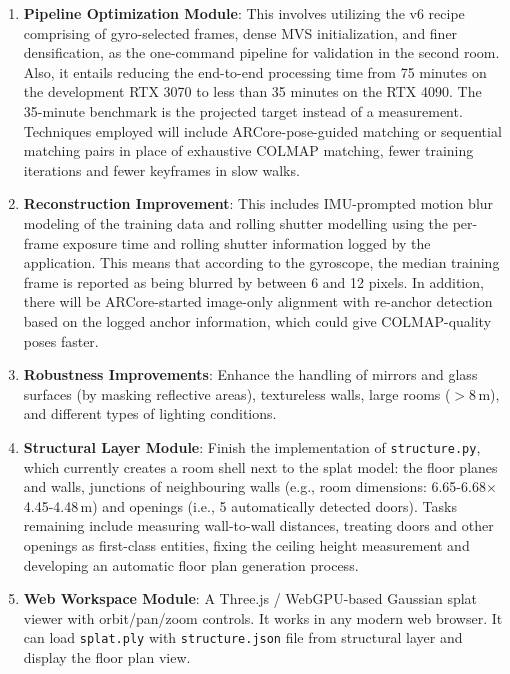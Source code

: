 \begin{enumerate}
    \item \textbf{Pipeline Optimization Module}: This involves utilizing the v6 recipe comprising of gyro-selected frames, dense MVS initialization, and finer densification, as the one-command pipeline for validation in the second room. Also, it entails reducing the end-to-end processing time from 75 minutes on the development RTX 3070 to less than 35 minutes on the RTX 4090. The 35-minute benchmark is the projected target instead of a measurement. Techniques employed will include ARCore-pose-guided matching or sequential matching pairs in place of exhaustive COLMAP matching, fewer training iterations and fewer keyframes in slow walks.

    \item \textbf{Reconstruction Improvement}: This includes IMU-prompted motion blur modeling of the training data and rolling shutter modelling using the per-frame exposure time and rolling shutter information logged by the application. This means that according to the gyroscope, the median training frame is reported as being blurred by between 6 and 12 pixels. In addition, there will be ARCore-started image-only alignment with re-anchor detection based on the logged anchor information, which could give COLMAP-quality poses faster.

    \item \textbf{Robustness Improvements}: Enhance the handling of mirrors and glass surfaces (by masking reflective areas), textureless walls, large rooms ($>$8\,m), and different types of lighting conditions.

    \item \textbf{Structural Layer Module}: Finish the implementation of \texttt{structure.py}, which currently creates a room shell next to the splat model: the floor planes and walls, junctions of neighbouring walls (e.g., room dimensions: 6.65-6.68$\times$4.45-4.48\,m) and openings (i.e., 5 automatically detected doors). Tasks remaining include measuring wall-to-wall distances, treating doors and other openings as first-class entities, fixing the ceiling height measurement and developing an automatic floor plan generation process.

    \item \textbf{Web Workspace Module}: A Three.js / WebGPU-based Gaussian splat viewer with orbit/pan/zoom controls. It works in any modern web browser. It can load \texttt{splat.ply} with \texttt{structure.json} file from structural layer and display the floor plan view.


\end{enumerate}
